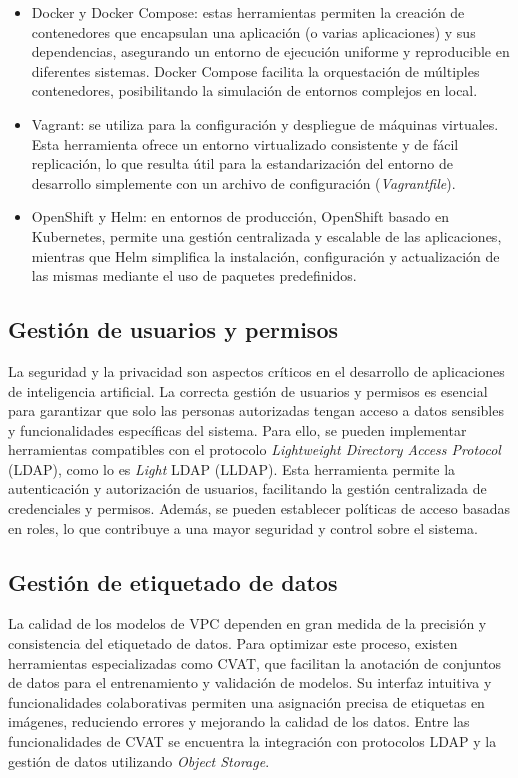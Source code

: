 \begin{itemize}
	\item Docker y Docker Compose: estas herramientas permiten la creación de contenedores que encapsulan una aplicación (o varias aplicaciones) y sus dependencias, asegurando un entorno de ejecución uniforme y reproducible en diferentes sistemas. Docker Compose facilita la orquestación de múltiples contenedores, posibilitando la simulación de entornos complejos en local.
	\item Vagrant: se utiliza para la configuración y despliegue de máquinas virtuales. Esta herramienta ofrece un entorno virtualizado consistente y de fácil replicación, lo que resulta útil para la estandarización del entorno de desarrollo simplemente con un archivo de configuración (\textit{Vagrantfile}).
	\item OpenShift y Helm: en entornos de producción, OpenShift basado en Kubernetes, permite una gestión centralizada y escalable de las aplicaciones, mientras que Helm simplifica la instalación, configuración y actualización de las mismas mediante el uso de paquetes predefinidos.
\end{itemize}

\subsection{Gestión de usuarios y permisos}

La seguridad y la privacidad son aspectos críticos en el desarrollo de aplicaciones de inteligencia artificial. La correcta gestión de usuarios y permisos es esencial para garantizar que solo las personas autorizadas tengan acceso a datos sensibles y funcionalidades específicas del sistema. Para ello, se pueden implementar herramientas compatibles con el protocolo \textit{Lightweight Directory Access Protocol} (LDAP), como lo es \textit{Light} LDAP (LLDAP). Esta herramienta permite la autenticación y autorización de usuarios, facilitando la gestión centralizada de credenciales y permisos. Además, se pueden establecer políticas de acceso basadas en roles, lo que contribuye a una mayor seguridad y control sobre el sistema.

\subsection{Gestión de etiquetado de datos}

La calidad de los modelos de VPC dependen en gran medida de la precisión y consistencia del etiquetado de datos. Para optimizar este proceso, existen herramientas especializadas como CVAT, que facilitan la anotación de conjuntos de datos para el entrenamiento y validación de modelos. Su interfaz intuitiva y funcionalidades colaborativas permiten una asignación precisa de etiquetas en imágenes, reduciendo errores y mejorando la calidad de los datos. Entre las funcionalidades de CVAT se encuentra la integración con protocolos LDAP y la gestión de datos utilizando \textit{Object Storage}.

